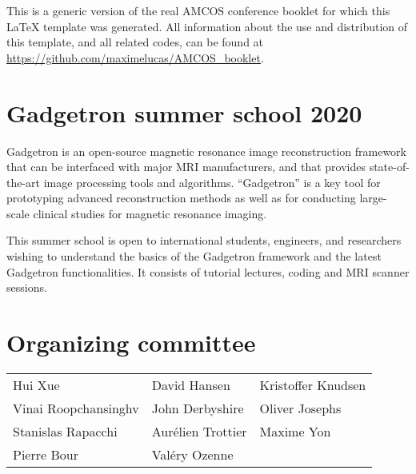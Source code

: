 {\small \textcolor{myblue}{This is a generic version of the real AMCOS conference booklet for which this \LaTeX{} template was generated. All information about the use and distribution of this template, and all related codes, can be found at \url{https://github.com/maximelucas/AMCOS\_booklet}.}}

\section{Gadgetron summer school 2020}

Gadgetron is an open-source magnetic resonance image reconstruction framework that can be interfaced with major MRI manufacturers, and that provides state-of-the-art image processing tools and algorithms. “Gadgetron” is a key tool for prototyping advanced reconstruction methods as well as for conducting large-scale clinical studies for magnetic resonance imaging.

This summer school is open to international students, engineers, and researchers wishing to understand the basics of the Gadgetron framework and the latest Gadgetron functionalities. It consists of tutorial lectures, coding and MRI scanner sessions.

\section{Organizing committee}
\begin{center}
\begin{tabular}{lll}
Hui Xue & David Hansen &  Kristoffer Knudsen \\
Vinai Roopchansinghv & John Derbyshire & Oliver Josephs \\ 
 Stanislas Rapacchi & Aurélien Trottier   &  Maxime Yon    \\
  Pierre Bour & Valéry Ozenne 
\end{tabular}
\end{center}
